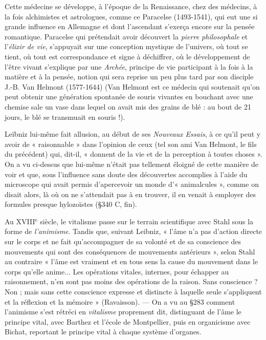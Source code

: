 \vspace{0.24cm}
{\footnotesize Cette médecine se développe, à l’époque de la Renaissance, chez des
médecins, à la fois alchimistes et astrologues, comme ce Paracelse (1493-1541),
qui eut une si grande influence en Allemagne et dont l’ascendant
s’exerça encore sur la pensée romantique. Paracelse qui prétendait avoir
découvert la {\it pierre philosophale} et l'{\it élixir de vie}, s'appuyait sur une
conception mystique de l’univers, où tout se tient, où tout est correspondance et
signe à déchiffrer, où le développement de l'être vivant s'explique par une
{\it Archée}, principe de vie participant à la fois à la matière et à la pensée,
notion qui sera reprise un peu plus tard par son disciple J.-B. Van Helmont
(1577-1644)
{\scriptsize (Van Helmont est ce médecin qui soutenait qu'on peut obtenir une génération
spontanée de souris vivantes en bouchant avec une chemise sale un vase dans lequel
on avait mis des grains de blé : au bout de 21 jours, le blé se transmuait en souris !)}.

Leïbniz lui-même fait allusion, au début de ses {\it Nouveaux Essais}, à ce
qu’il peut y avoir de « raisonnable » dans l'opinion de ceux (tel son ami
Van Helmont, le fils du précédent) qui, dit-il, « donnent de la vie et de la
perception à toutes choses ». On a vu ci-dessus que lui-même n'était pas
tellement éloigné de cette manière de voir et que, sous l'influence sans
doute des découvertes accomplies à l’aide du microscope qui avait permis
d'apercevoir un monde d’« animalcules », comme on disait alors, là où on
ne s’attendait pas à en trouver, il en venait à employer des formules presque
hylozoïstes (\S 340 C, fin).

Au {\footnotesize XVIII}$^\text{e}$ siècle, le vitalisme passe sur le terrain scientifique avec Stahl
sous la forme de {\it l’animisme}. Tandis que, suivant Leibniz, « l'âme n’a pas
d'action directe sur le corps et ne fait qu'accompagner de sa volonté et de
sa conscience des mouvements qui sont des conséquences de mouvements
antérieurs », selon Stahl au contraire « l'âme est vraiment et en tous sens
la cause du mouvement dans le corps qu’elle anime... Les opérations vitales,
internes, pour échapper au raisonnement, n’en sont pas moins des opérations
de la raison. Sans conscience ? Non ; mais sans cette conscience expresse et
distincte à laquelle seule s'appliquent et la réflexion et la mémoire »
(Ravaisson). — On a vu au \S283 comment l’animisme s’est rétréci en {\it vitalisme}
proprement dit, distinguant de l’âme le principe vital, avec Barthez et
l'école de Montpellier, puis en organicisme avec Bichat, reportant le principe
vital à chaque système d'organes.}
\vspace{0.31cm}


